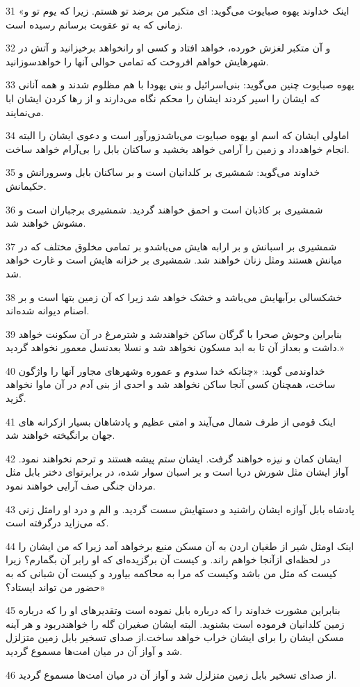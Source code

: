 \par 31 «اینک خداوند یهوه صبایوت می‌گوید: ای متکبر من بر‌ضد تو هستم. زیرا که یوم تو و زمانی که به تو عقوبت برسانم رسیده است.
\par 32 و آن متکبر لغزش خورده، خواهد افتاد و کسی او رانخواهد برخیزانید و آتش در شهرهایش خواهم افروخت که تمامی حوالی آنها را خواهدسوزانید.
\par 33 یهوه صبایوت چنین می‌گوید: بنی‌اسرائیل و بنی یهودا با هم مظلوم شدند و همه آنانی که ایشان را اسیر کردند ایشان را محکم نگاه می‌دارند و از رها کردن ایشان ابا می‌نمایند.
\par 34 اماولی ایشان که اسم او یهوه صبایوت می‌باشدزورآور است و دعوی ایشان را البته انجام خواهدداد و زمین را آرامی خواهد بخشید و ساکنان بابل را بی‌آرام خواهد ساخت.
\par 35 خداوند می‌گوید: شمشیری بر کلدانیان است و بر ساکنان بابل وسرورانش و حکیمانش.
\par 36 شمشیری بر کاذبان است و احمق خواهند گردید. شمشیری برجباران است و مشوش خواهند شد.
\par 37 شمشیری بر اسبانش و بر ارابه هایش می‌باشدو بر تمامی مخلوق مختلف که در میانش هستند ومثل زنان خواهند شد. شمشیری بر خزانه هایش است و غارت خواهد شد.
\par 38 خشکسالی برآبهایش می‌باشد و خشک خواهد شد زیرا که آن زمین بتها است و بر اصنام دیوانه شده‌اند.
\par 39 بنابراین وحوش صحرا با گرگان ساکن خواهندشد و شترمرغ در آن سکونت خواهد داشت و بعداز آن تا به ابد مسکون نخواهد شد و نسلا بعدنسل معمور نخواهد گردید.»
\par 40 خداوندمی گوید: «چنانکه خدا سدوم و عموره وشهرهای مجاور آنها را واژگون ساخت، همچنان کسی آنجا ساکن نخواهد شد و احدی از بنی آدم در آن ماوا نخواهد گزید.
\par 41 اینک قومی از طرف شمال می‌آیند و امتی عظیم و پادشاهان بسیار ازکرانه های جهان برانگیخته خواهند شد.
\par 42 ایشان کمان و نیزه خواهند گرفت. ایشان ستم پیشه هستند و ترحم نخواهند نمود. آواز ایشان مثل شورش دریا است و بر اسبان سوار شده، در برابرتو‌ای دختر بابل مثل مردان جنگی صف آرایی خواهند نمود.
\par 43 پادشاه بابل آوازه ایشان راشنید و دستهایش سست گردید. و الم و درد او رامثل زنی که می‌زاید در‌گرفته است.
\par 44 اینک اومثل شیر از طغیان اردن به آن مسکن منیع برخواهد آمد زیرا که من ایشان را در لحظه‌ای ازآنجا خواهم راند. و کیست آن برگزیده‌ای که او رابر آن بگمارم؟ زیرا کیست که مثل من باشد وکیست که مرا به محاکمه بیاورد و کیست آن شبانی که به حضور من تواند ایستاد؟»
\par 45 بنابراین مشورت خداوند را که درباره بابل نموده است وتقدیرهای او را که درباره زمین کلدانیان فرموده است بشنوید. البته ایشان صغیران گله را خواهندربود و هر آینه مسکن ایشان را برای ایشان خراب خواهد ساخت.از صدای تسخیر بابل زمین متزلزل شد و آواز آن در میان امت‌ها مسموع گردید.
\par 46 از صدای تسخیر بابل زمین متزلزل شد و آواز آن در میان امت‌ها مسموع گردید.
 
